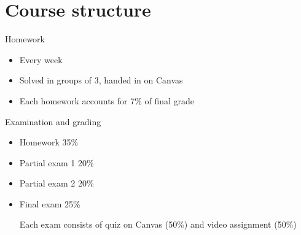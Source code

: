 \documentclass[presentation,aspectratio=169]{beamer}
\begin{document}
\section{Course structure}
\label{sec:org6e9a9f3}
\begin{frame}[label={sec:orgfd160b4}]{Homework}
\begin{itemize}
\item Every week
\item Solved in groups of 3, handed in on Canvas
\item Each homework accounts for 7\% of final grade
\end{itemize}
\end{frame}

\begin{frame}[label={sec:org890336d}]{Examination and grading}
\begin{itemize}
\item Homework 35\%
\item Partial exam 1 20\%
\item Partial exam 2 20\%
\item Final exam 25\%

Each exam consists of quiz on Canvas (50\%) and video assignment (50\%)
\end{itemize}
\end{frame}
\end{document}
